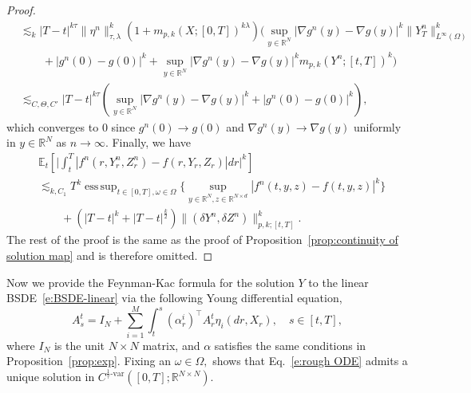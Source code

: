 \documentclass[11pt,reqno]{amsart}
\def\R{\mathbb R}
\DeclareMathOperator*{\esssup}{ess\,sup}
\numberwithin{equation}{section}
\begin{document}
\begin{proof}
\begin{equation*}
\begin{aligned}
&\lesssim_{k} |T-t|^{k\tau}\|\eta^{n}\|^{k}_{\tau,\lambda}\left(1 + m_{p,k}(X;[0,T])^{k\lambda}\right)\Big(\sup_{y\in\R^N}|\nabla g^n(y) - \nabla g(y)|^{k} \|Y^{n}_{T}\|^k_{L^{\infty}(\Omega)}\\
&\qquad + |g^{n}(0) - g(0)|^k + \sup_{y\in\R^N}|\nabla g^n(y) - \nabla g(y)|^k m_{p,k}(Y^{n};[t,T])^k\Big)\\
&\lesssim_{C,\Theta,C'} |T-t|^{k\tau}\left(\sup_{y\in\R^N}|\nabla g^n(y) - \nabla g(y)|^{k} + |g^{n}(0) - g(0)|^k\right),
\end{aligned}
\end{equation*}
which converges to $0$ since $g^n(0)\rightarrow g(0)$ and $\nabla g^n(y) \rightarrow \nabla g(y)$ uniformly in $y\in\mathbb{R}^N$ as $n\rightarrow \infty$. 
Finally, we have
\begin{equation*}
\begin{aligned}
&\mathbb{E}_t\left[\Big|\int_{t}^{T}|f^{n}(r,Y^n_r,Z^n_r) - f(r,Y_r,Z_r)|dr\Big|^{k}\right]\\
&\lesssim_{k,C_1}  T^k\esssup_{t\in[0,T],\omega\in\Omega}\Big\{\sup_{y\in\mathbb{R}^{N},z\in\mathbb{R}^{N\times d}}|f^{n}(t,y,z) - f(t,y,z)|^k\Big\} \\
&\qquad  + (|T-t|^{k} + |T-t|^{\frac{k}{2}})\|(\delta Y^n,\delta Z^n)\|^{k}_{p,k;[t,T]}.
\end{aligned}
\end{equation*}
The rest of the proof is the same as the proof of Proposition~\ref{prop:continuity of solution map} and is therefore omitted.
\end{proof}

Now we provide the Feynman-Kac formula for the solution  $Y$  to the linear BSDE~\eqref{e:BSDE-linear} 
via the following Young differential equation, 
\begin{equation}\label{e:rough ODE}
A^{t}_{s} = I_{N} + \sum_{i=1}^{M}\int_{t}^{s}(\alpha^{i}_r)^{\top} A^{t}_r \eta_{i}(dr,X_r),\quad s\in[t,T],
\end{equation}
where $I_{N}$ is the unit $N\times N$ matrix, and $\alpha$ satisfies the same conditions in Proposition~\ref{prop:exp}. Fixing an $\omega\in\Omega,$ \cite[Proposition~7]{lejay2010controlled} shows that Eq.~\eqref{e:rough ODE} admits a unique solution in $C^{\frac{1}{\tau}\text{-var}}([0,T];\R^{N\times N}).$ 
\end{document}
